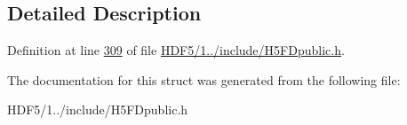 \subsection{Detailed Description}


Definition at line \hyperlink{_h_d_f5_21_810_81_2include_2_h5_f_dpublic_8h_source_l00309}{309} of file \hyperlink{_h_d_f5_21_810_81_2include_2_h5_f_dpublic_8h_source}{H\+D\+F5/1../include/\+H5\+F\+Dpublic.\+h}.



The documentation for this struct was generated from the following file\+:\begin{DoxyCompactItemize}
\item 
H\+D\+F5/1../include/\+H5\+F\+Dpublic.\+h\end{DoxyCompactItemize}
